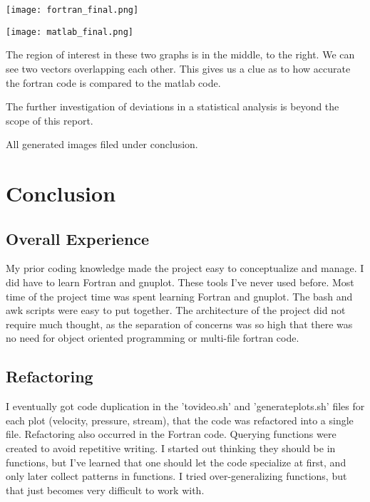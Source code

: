 \documentclass[listof=totoc]{report}
\begin{document}
\begin{center}
\texttt{[image: fortran\_final.png]}
\end{center}
\begin{center}
\texttt{[image: matlab\_final.png]}
\end{center}

The region of interest in these two graphs is in the middle, to the right. We can see two vectors overlapping each other. This gives us a clue as to how accurate the fortran code is compared to the matlab code.

The further investigation of deviations in a statistical analysis is beyond the scope of this report.

All generated images filed under conclusion.


\chapter{Conclusion}
\section{Overall Experience}
My prior coding knowledge made the project easy to conceptualize and manage. I did have to learn Fortran and gnuplot. These tools I've never used before. Most time of the project time was spent learning Fortran and gnuplot. The bash and awk scripts were easy to put together. The architecture of the project did not require much thought, as the separation of concerns was so high that there was no need for object oriented programming or multi-file fortran code.

\section{Refactoring}
I eventually got code duplication in the 'tovideo.sh' and 'generate\textunderscore plots.sh' files for each plot (velocity, pressure, stream), that the code was refactored into a single file. Refactoring also occurred in the Fortran code. Querying functions were created to avoid repetitive writing. I started out thinking they should be in functions, but I've learned that one should let the code specialize at first, and only later collect patterns in functions. I tried over-generalizing functions, but that just becomes very difficult to work with.
\end{document}

